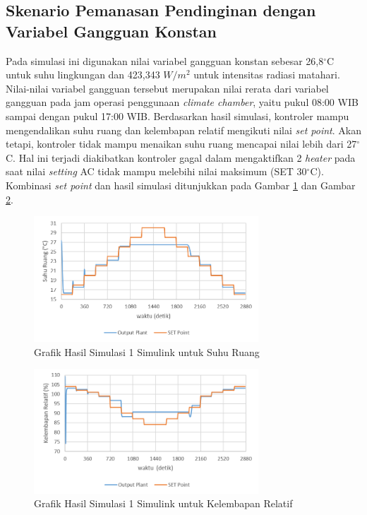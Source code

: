 \subsection{Skenario Pemanasan Pendinginan dengan Variabel Gangguan Konstan}

Pada simulasi ini digunakan nilai variabel gangguan konstan sebesar 26,8$^\circ$C untuk suhu lingkungan dan 423,343 $W/m^2$ untuk intensitas radiasi matahari. Nilai-nilai variabel gangguan tersebut merupakan nilai rerata dari variabel gangguan pada jam operasi penggunaan \textit{climate chamber}, yaitu pukul 08:00 WIB sampai dengan pukul 17:00 WIB. Berdasarkan hasil simulasi, kontroler mampu mengendalikan suhu ruang dan kelembapan relatif mengikuti nilai \textit{set point}. Akan tetapi, kontroler tidak mampu menaikan suhu ruang mencapai nilai lebih dari 27$^\circ$C. Hal ini terjadi diakibatkan kontroler gagal dalam mengaktifkan 2 \textit{heater} pada saat nilai \textit{setting} AC tidak mampu melebihi nilai maksimum (SET 30$^\circ$C). Kombinasi \textit{set point} dan hasil simulasi ditunjukkan pada Gambar \ref{fig:5:SimulinkTd} dan Gambar \ref{fig:5:SimulinkRH}.

\begin{figure}[!h]
	\centering
	\includegraphics[width=0.75\textwidth]{figures/Simulink1Td}
	\caption{Grafik Hasil Simulasi 1 Simulink untuk Suhu Ruang}
	\label{fig:5:SimulinkTd}
\end{figure}

\begin{figure}[!h]
	\centering
	\includegraphics[width=0.75\textwidth]{figures/Simulink1RH}
	\caption{Grafik Hasil Simulasi 1 Simulink untuk Kelembapan Relatif}
	\label{fig:5:SimulinkRH}
\end{figure}

